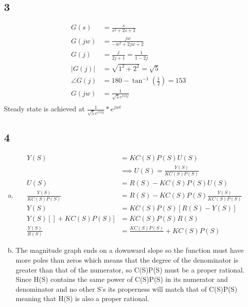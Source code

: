 \documentclass[12pt]{article}
\begin{document}
\subsection*{3}
\begin{align*}
    G(s) & = \frac{s}{s^2 + 2s + 2}\\
    G(jw) &= \frac{jw}{-w^2 + 2jw + 2}\\
    G(j) &= \frac{j}{2j + 1} = \frac{1}{1-2j}\\
    |G(j)| &= \sqrt{1^2 + 2^2} = \sqrt{5}\\
    \angle G(j) &= 180 - \tan^{-1}(\frac{1}{2}) = 153\\
    G(jw) &= \frac{1}{\sqrt{5}e^{153j}}\\
\end{align*}
Steady state is achieved at $\frac{1}{\sqrt{5}e^{153j}} * e^{jwt}$


\subsection*{4}
\begin{enumerate}[a)]
    \item
    \begin{align*}
        Y(S) &= KC(S)P(S)U(S)\\
            & \implies U(S) = \frac{Y(S)}{KC(S)P(S)}\\
        U(S) &= R(S) - KC(S)P(S)U(S)\\
        \frac{Y(S)}{KC(S)P(S)} &= R(S) - KC(S)P(S) \frac{Y(S)}{KC(S)P(S)}\\
        Y(S) &= KC(S)P(S)[R(S) - Y(S)]\\
        Y(S)[]+KC(S)P(S)] &= KC(S)P(S)R(S)\\
        \frac{Y(S)}{R(S)} &= \frac{KC(S)P(S)}{} + KC(S)P(S)
    \end{align*}
    \item The magnitude graph ends on a downward slope so the function must have more poles than zeros which means that the degree of the denominator is greater than that of the numerator, so C(S)P(S) must be a proper rational. Since H(S) contains the same power of C(S)P(S) in its numerator and denominator and no other S's its properness will match that of C(S)P(S) meaning that H(S) is also a proper rational.
\end{enumerate}
\end{document}
